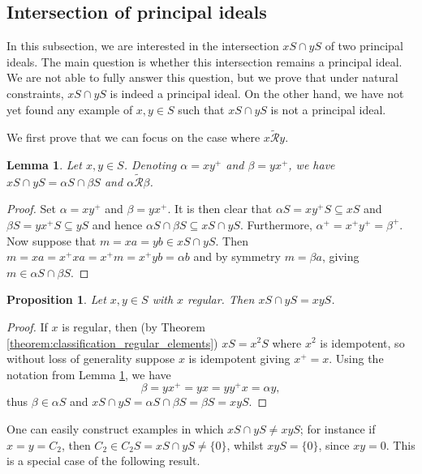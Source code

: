 \documentclass[a4paper, 11pt]{article}
\theoremstyle{plain}
\newtheorem{lemma}      [theorem]{Lemma}
\newtheorem{proposition}[theorem]{Proposition}
\theoremstyle{definition}
\begin{document}
\subsection{Intersection of principal ideals} \label{subsection:intersection_principal_ideals}

In this subsection, we are interested in the intersection $xS \cap yS$ of two principal ideals. The main question is whether this intersection remains a principal ideal. We are not able to fully answer this question, but we prove that under natural constraints, $xS \cap yS$ is indeed a principal ideal. On the other hand, we have not yet found any example of $x, y \in S$ such that $xS \cap yS$ is not a principal ideal.

We first prove that we can focus on the case where $x \tilde{\mathcal{R}} y$.

\begin{lemma} \label{lemma:alpha_beta}
Let $x,y \in S$. Denoting $\alpha = x y^+$ and $\beta = y x^+$, we have $xS \cap yS = \alpha S \cap \beta S$ and $\alpha \tilde{\mathcal{R}} \beta$.
\end{lemma}

\begin{proof}
Set $\alpha = x y^+$ and $\beta = y x^+$.
It is then clear that $\alpha S  = x y^+ S \subseteq xS$ and $\beta S  = y x^+ S \subseteq yS$ and hence $\alpha S\cap \beta S \subseteq xS \cap yS$. Furthermore,
$\alpha^+ = x^+ y^+ = \beta^+$.  Now suppose that $m = xa = yb \in xS \cap yS$. 
Then $m = xa = x^+ xa = x^+ m = x^+ y b = \alpha b$ and by symmetry $m = \beta a$, giving $m \in \alpha S \cap \beta S$.  
\end{proof}



\begin{proposition} \label{proposition:x_regular}    
Let $x,y \in S$ with $x$ regular. Then $xS \cap yS = xyS$.
\end{proposition}

\begin{proof}
If $x$ is regular, then (by Theorem \ref{theorem:classification_regular_elements}) $xS = x^2S$ where $x^2$ is idempotent, so without loss of generality suppose $x$ is idempotent giving $x^+ = x$. Using the notation from Lemma \ref{lemma:alpha_beta}, we have
\[
    \beta = y x^+ = yx = y y^+ x = \alpha y,
\]
thus $\beta \in \alpha S$ and $xS \cap yS = \alpha S \cap \beta S = \beta S= xyS$.
\end{proof}

One can easily construct examples in which $xS \cap yS \neq xyS$; for instance if $x = y=C_2$, then $C_2 \in C_2S = xS \cap yS \neq \{0\}$, whilst $xyS = \{0\}$, since $xy=0$. This is a special case of the following result.
\end{document}
